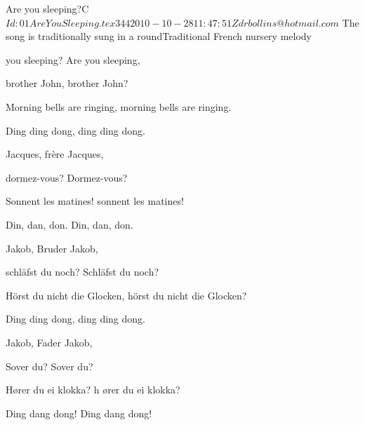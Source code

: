 \begin{SBSong}{Are you sleeping?}{C}
    {$Id: 01AreYouSleeping.tex 344 2010-10-28 11:47:51Z drbollins@hotmail.com $}
    {The song is traditionally sung in a round}{Traditional French nursery melody}
  \begin{SBVerse}
     you sleeping? Are you sleeping, 

    brother John, brother John?

    Morning bells are ringing, morning bells are ringing. 

    Ding ding dong, ding ding dong.
  \end{SBVerse}
  \begin{SBVerse}
     Jacques, fr\`{e}re Jacques, 
    
    dormez-vous? Dormez-vous?

    Sonnent les matines! sonnent les matines!

    Din, dan, don. Din, dan, don.
  \end{SBVerse}
  \begin{SBVerse}
     Jakob, Bruder Jakob,  

    schl\"{a}fst du noch? Schl\"{a}fst du noch?
    
    H\"{o}rst du nicht die Glocken, h\"{o}rst du nicht die Glocken? 

    Ding ding dong, ding ding dong.
  \end{SBVerse}
  \begin{SBVerse}
     Jakob, Fader Jakob,  
  
    Sover du? Sover du?
    
    H\o rer du ei klokka? h \o rer du ei klokka?
    
    Ding dang dong! Ding dang dong!
  \end{SBVerse}
\end{SBSong}

